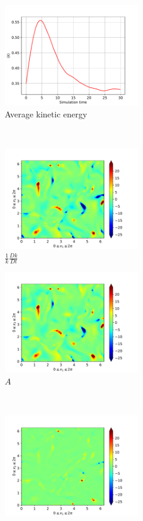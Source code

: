 \newpage

\begin{figure}[H]
    \begin{subfigure}[H]{0.45\textwidth}
        \includegraphics[height=1.75in]{media/run-cds-65/ke-average1340}
        \caption{Average kinetic energy}
    \end{subfigure}
    ~
    \begin{subfigure}[H]{0.45\textwidth}
        \includegraphics[height=1.75in]{media/run-cds-65/ke-1340}
        \caption{$\frac{1}{k} \frac{D k}{Dt}$}
    \end{subfigure}
    \newline
    \begin{subfigure}{0.45\textwidth}
        \includegraphics[height=1.75in]{media/run-cds-65/A-ke-1340}
        \caption{$A$}
    \end{subfigure}
    ~
    \begin{subfigure}{0.45\textwidth}
        \includegraphics[height=1.75in]{media/run-cds-65/C-ke-1340}

\end{subfigure}
\end{figure}
